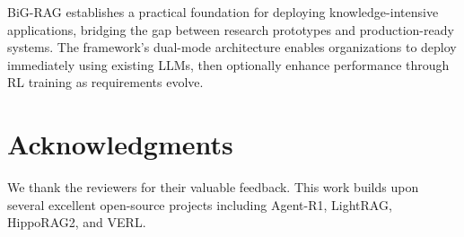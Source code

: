 \documentclass[11pt,a4paper]{article}
\begin{document}
BiG-RAG establishes a practical foundation for deploying knowledge-intensive applications, bridging the gap between research prototypes and production-ready systems. The framework's dual-mode architecture enables organizations to deploy immediately using existing LLMs, then optionally enhance performance through RL training as requirements evolve.

\section*{Acknowledgments}

We thank the reviewers for their valuable feedback. This work builds upon several excellent open-source projects including Agent-R1, LightRAG, HippoRAG2, and VERL.



\end{document}
